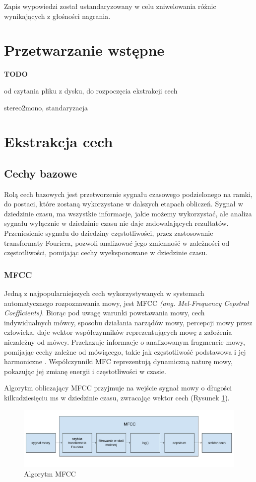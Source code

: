 \documentclass[a4paper,12pt,twoside,openany]{report}
\newcommand{\TODO}{\textbf{TODO}}
\newcommand*\NewPage{\newpage\null\thispagestyle{empty}\newpage}
\newcommand{\ang}[1]{\textit{(ang. #1)}}
\newcommand{\Rys}[1]{(Rysunek \ref{#1})}
\begin{document}
Zapis wypowiedzi został ustandaryzowany w celu zniwelowania różnic wynikających z głośności nagrania.
\section{Przetwarzanie wstępne}
\TODO{
	od czytania pliku z dysku, do rozpoczęcia ekstrakcji cech

	stereo2mono, standaryzacja
}
\NewPage
\section{Ekstrakcja cech}
\subsection{Cechy bazowe}
Rolą cech bazowych jest przetworzenie sygnału czasowego podzielonego na ramki,
do postaci, które zostaną wykorzystane w dalszych etapach obliczeń.
Sygnał w dziedzinie czasu, ma wszystkie informacje, jakie możemy wykorzystać, 
ale analiza sygnału wyłącznie w dziedzinie czasu nie daje zadowalających rezultatów.
Przeniesienie sygnału do dziedziny częstotliwości, przez zastosowanie transformaty Fouriera,
pozwoli analizować jego zmienność w zależności od częstotliwości, 
pomijając cechy wyeksponowane w dziedzinie czasu.
\subsubsection{MFCC}
Jedną z najpopularniejszych cech wykorzystywanych w systemach automatycznego rozpoznawania mowy,
jest MFCC \ang{Mel-Frequency Cepstral Coefficients}.
Biorąc pod uwagę warunki powstawania mowy, cech indywidualnych mówcy, sposobu działania narządów mowy, percepcji mowy przez człowieka,
daje wektor współczynników reprezentujących mowę z założenia niezależny od mówcy. 
Przekazuje informacje o analizowanym fragmencie mowy, pomijając cechy zależne od mówiącego, takie jak częstotliwość podstawowa i jej harmoniczne \cite{Hossan2013}.
Współczynniki MFC reprezentują dynamiczną naturę mowy, pokazując jej zmianę energii i częstotliwości w czasie.

Algorytm obliczający MFCC przyjmuje na wejście sygnał mowy o długości kilkudziesięciu ms w dziedzinie czasu,
zwracając wektor cech \Rys{rys:mgcc:schemat}.
\begin{figure}[h]
	\centering
	\includegraphics[width=\textwidth]{mfcc-schemat}
	\caption{Algorytm MFCC}
	\label{rys:mgcc:schemat}
\end{figure}
\end{document}
